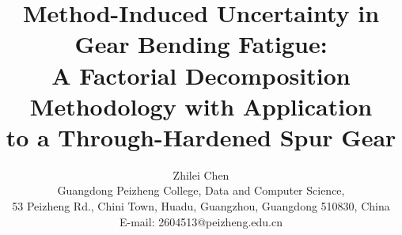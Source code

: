 \documentclass[12pt,a4paper]{article}
\begin{document}
\title{\textbf{Method-Induced Uncertainty in Gear Bending Fatigue:\\
A Factorial Decomposition Methodology with Application\\
to a Through-Hardened Spur Gear}}

\author{Zhilei Chen\\
Guangdong Peizheng College, Data and Computer Science,\\
53 Peizheng Rd., Chini Town, Huadu, Guangzhou, Guangdong 510830, China\\
E-mail: 2604513@peizheng.edu.cn}

\maketitle

\end{document}
